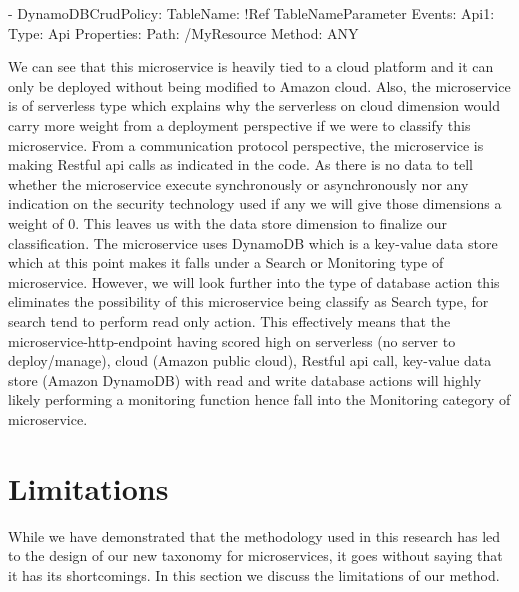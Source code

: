 \documentclass{article}
\begin{document}
        - DynamoDBCrudPolicy:
            TableName: !Ref TableNameParameter
      Events:
        Api1:
          Type: Api
          Properties:
            Path: /MyResource
            Method: ANY

We can see that this microservice is heavily tied to a cloud platform and it can only be deployed without being modified to Amazon cloud. Also, the microservice is of serverless type which explains why the serverless on cloud dimension would carry more weight from a deployment perspective if we were to classify this microservice. From a communication protocol perspective, the microservice is making Restful api calls as indicated in the code. As there is no data to tell whether the microservice execute synchronously or asynchronously nor any indication on the security technology used if any we will give those dimensions a weight of 0. This leaves us with the data store dimension to finalize our classification. The microservice uses DynamoDB which is a key-value data store which at this point makes it falls under a Search or Monitoring type of microservice. However, we will look further into the type of database action this eliminates the possibility of this microservice being classify as Search type, for search tend to perform read only action. This effectively means that the microservice-http-endpoint having scored high on serverless (no server to deploy/manage), cloud (Amazon public cloud), Restful api call, key-value data store (Amazon DynamoDB) with read and write database actions will highly likely performing a monitoring function hence fall into the Monitoring category of microservice.

\section{Limitations}

While we have demonstrated that the methodology used in this research has led to the design of our new taxonomy for microservices, it goes without saying that it has its shortcomings. In this section we discuss the limitations of our method.
\end{document}
